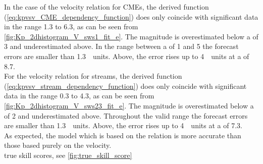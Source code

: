 In the case of the velocity relation for CMEs, the derived function (\ref{eq:kpvsv_CME_dependency_function}) does only coincide with significant data in the \Kp{} range 1.3 to 6.3, as can be seen from \autoref{fig:Kp_2dhistogram_V_sws1_fit_e}. The magnitude is overestimated below a \Kp{} of 3 and underestimated above. In the range between a \Kp{} of 1 and 5 the forecast errors are smaller than 1.3~\Kp~units. Above, the error rises up to 4~\Kp~units at a \Kp{} of 8.7.\\

For the velocity relation for streams, the derived function (\ref{eq:kpvsv_stream_dependency_function}) does only coincide with significant data in the \Kp{} range 0.3 to 4.3, as can be seen from \autoref{fig:Kp_2dhistogram_V_sws23_fit_e}. The magnitude is overestimated below a \Kp{} of 2 and underestimated above. Throughout the valid range the forecast errors are smaller than 1.3~\Kp~units. Above, the error rises up to 4~\Kp~units at a \Kp{} of 7.3.\\


As expected, the model which is based on the \vBz{} relation is more accurate than those based purely on the velocity.\\


true skill scores, see \autoref{fig:true_skill_score}\\
\begin{figure}
\end{figure}



